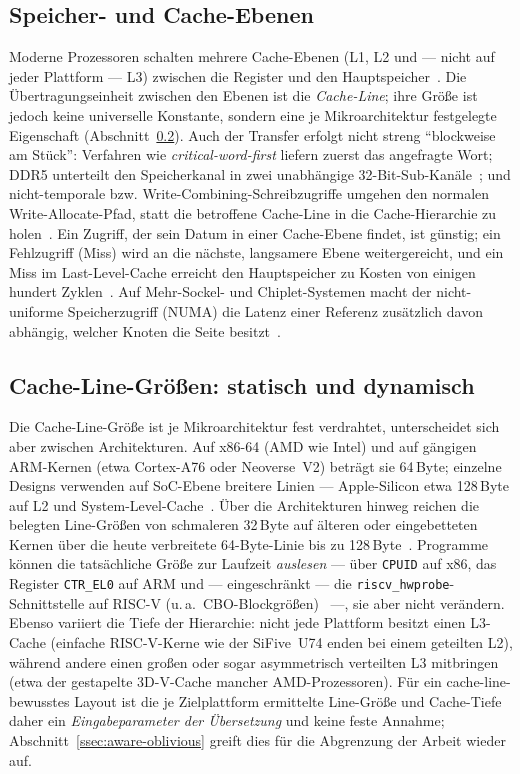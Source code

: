 \subsection{Speicher- und Cache-Ebenen}\label{ssec:cache-levels}
Moderne Prozessoren schalten mehrere Cache-Ebenen (L1, L2 und --- nicht auf jeder Plattform --- L3)
zwischen die Register und den Hauptspeicher~\cite{hennessy2019architecture}. Die Übertragungseinheit
zwischen den Ebenen ist die \emph{Cache-Line}; ihre Größe ist jedoch keine universelle Konstante,
sondern eine je Mikroarchitektur festgelegte Eigenschaft (Abschnitt~\ref{ssec:cache-line-sizes}).
Auch der Transfer erfolgt nicht streng \enquote{blockweise am Stück}: Verfahren wie
\emph{critical-word-first} liefern zuerst das angefragte Wort; DDR5 unterteilt den Speicherkanal in
zwei unabhängige 32-Bit-Sub-Kanäle~\cite{micron_ddr5}; und nicht-temporale bzw.
Write-Combining-Schreibzugriffe umgehen den normalen Write-Allocate-Pfad, statt die betroffene
Cache-Line in die Cache-Hierarchie zu holen~\cite{intel_sdm}. Ein Zugriff, der sein Datum in einer
Cache-Ebene findet, ist günstig; ein Fehlzugriff (Miss) wird an die nächste, langsamere Ebene
weitergereicht, und ein Miss im Last-Level-Cache erreicht den Hauptspeicher zu Kosten von einigen
hundert Zyklen~\cite{hennessy2019architecture,drepper2007memory}. Auf Mehr-Sockel- und
Chiplet-Systemen macht der nicht-uniforme Speicherzugriff (NUMA) die Latenz einer Referenz
zusätzlich davon abhängig, welcher Knoten die Seite besitzt~\cite{drepper2007memory}.

\subsection{Cache-Line-Größen: statisch und dynamisch}\label{ssec:cache-line-sizes}
Die Cache-Line-Größe ist je Mikroarchitektur fest verdrahtet, unterscheidet sich aber zwischen
Architekturen. Auf x86-64 (AMD wie Intel) und auf gängigen ARM-Kernen (etwa Cortex-A76 oder
Neoverse~V2) beträgt sie 64\,Byte; einzelne Designs verwenden auf SoC-Ebene breitere Linien ---
Apple-Silicon etwa 128\,Byte auf L2 und System-Level-Cache~\cite{apple_optimization}. Über die
Architekturen hinweg reichen die belegten Line-Größen von schmaleren 32\,Byte auf älteren oder
eingebetteten Kernen über die heute verbreitete 64-Byte-Linie bis zu
128\,Byte~\cite{hennessy2019architecture,intel_optimization,amd_sog}. Programme können die
tatsächliche Größe zur Laufzeit \emph{auslesen} --- über \texttt{CPUID} auf x86, das Register
\texttt{CTR\_EL0} auf ARM und --- eingeschränkt --- die \texttt{riscv\_hwprobe}-Schnittstelle auf
RISC-V (u.\,a.\ CBO-Blockgrößen)~\cite{arm_arm,intel_sdm} ---, sie aber nicht verändern. Ebenso
variiert die Tiefe der Hierarchie: nicht jede Plattform besitzt einen L3-Cache (einfache
RISC-V-Kerne wie der SiFive~U74 enden bei einem geteilten L2), während andere einen großen oder
sogar asymmetrisch verteilten L3 mitbringen (etwa der gestapelte 3D-V-Cache mancher
AMD-Prozessoren). Für ein cache-line-bewusstes Layout ist die je Zielplattform ermittelte Line-Größe
und Cache-Tiefe daher ein \emph{Eingabeparameter der Übersetzung} und keine feste Annahme;
Abschnitt~\ref{ssec:aware-oblivious} greift dies für die Abgrenzung der Arbeit wieder auf.

